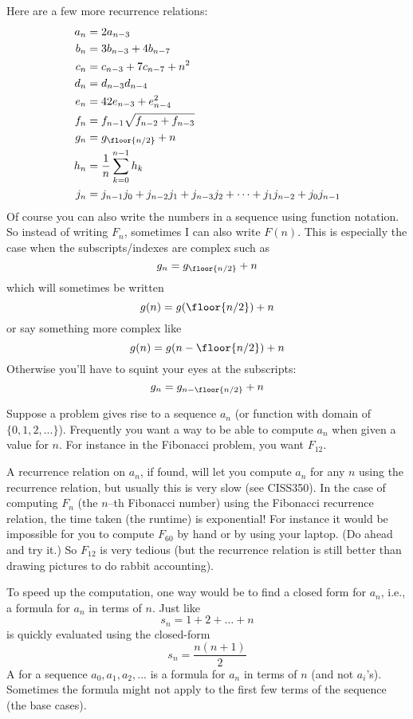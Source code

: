 Here are a few more recurrence relations:
\begin{align*}
  a_n &= 2a_{n - 3} \\
  b_n &= 3b_{n - 3} + 4b_{n - 7} \\
  c_n &= c_{n - 3} + 7c_{n - 7} + n^2\\
  d_n &= d_{n - 3} d_{n-4} \\
  e_n &= 42e_{n - 3} + e_{n-4}^2\\
  f_n &= f_{n - 1} \sqrt{f_{n-2} + f_{n-3}}\\
  g_n &= g_{\floor{n/2}} + n \\
  h_n &= \frac{1}{n} \sum_{k=0}^{n-1} h_k \\
  j_n &= j_{n-1}j_0 + j_{n-2}j_1 + j_{n-3}j_2 + \cdots + j_1j_{n-2} + j_0j_{n-1}
\end{align*}
Of course you can also write the numbers in a sequence using
function notation.
So instead of writing $F_n$, sometimes I can also write
$F(n)$.
This is especially the case when the subscripts/indexes are complex such as
\[
  g_n = g_{\floor{n/2}} + n
\]
which will sometimes be written
\[
  g(n) = g(\floor{n/2}) + n
\]
or say something more complex like
\[
  g(n) = g(n - \floor{n/2}) + n
\]
Otherwise you'll have to squint your eyes at the subscripts:
\[
  g_n = g_{n - \floor{n/2}} + n
\]

Suppose a problem gives rise to a sequence $a_n$
(or function with domain of $\{0,1,2,...\}$). 
Frequently you want a way to be able to compute $a_n$ when given a value for
$n$.
For instance in the Fibonacci problem, you want $F_{12}$.

A recurrence relation on $a_n$, if found, will let you compute $a_n$
for any $n$ using the recurrence relation, but usually this is very slow
(see CISS350).
In the case of computing $F_{n}$ (the $n$--th Fibonacci number) using
the Fibonacci recurrence relation, the time taken (the runtime)
is exponential!
For instance it would be impossible for you to compute $F_{60}$ by hand or by
using your laptop. (Do ahead and try it.)
So $F_{12}$ is very tedious (but the recurrence relation is still better
than drawing pictures to do rabbit accounting).

To speed up the computation, one way would be to find a closed form for $a_n$,
i.e., a formula for $a_n$ in terms of $n$.
Just like 
\[
s_n = 1 + 2 + \ldots + n
\]
is quickly evaluated using the closed-form 
\[
s_n = \frac{n(n+1)}{2}
\]
A  for a sequence $a_0, a_1, a_2, ...$ is a formula
for $a_n$ in terms of $n$ (and not $a_i$'s).
Sometimes the formula might not apply to the first few terms of
the sequence (the base cases). 

